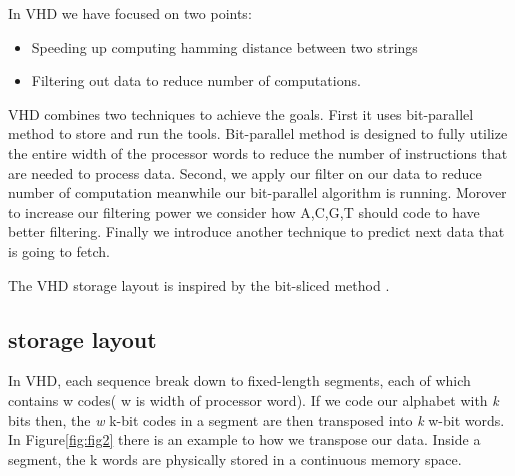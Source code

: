 In VHD we have focused on two points:
\begin{itemize}
\item Speeding up computing hamming distance between two strings
\item Filtering out data to reduce number of computations.
\end{itemize}
  
 VHD combines two techniques to achieve the goals. First it uses bit-parallel method to store and run the tools. Bit-parallel method is designed to fully utilize the entire width of the processor words to reduce the number of instructions that are needed to process data. Second, we apply  our filter on our data to reduce number of computation meanwhile our bit-parallel algorithm is running. Morover to increase our filtering power we consider how A,C,G,T should code to have better filtering. Finally we introduce another technique to predict next data that is going to fetch.
 
 The VHD storage layout is inspired by the bit-sliced method \cite{O_Neil_1997}. 
 \subsection{storage layout}
 In VHD, each sequence break down to fixed-length segments, each of which contains w codes( w is width of processor word). If we code our alphabet with \emph{k} bits then, the \emph{w} k-bit codes in a segment are then transposed into \emph{k} w-bit words. In Figure\ref{fig:fig2} there is an example to how we transpose our data. Inside a segment, the k words are physically stored in a continuous memory space.
 
  